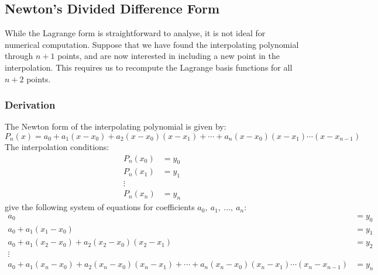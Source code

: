 \documentclass{article}
\begin{document}
\subsection{Newton's Divided Difference Form}
While the Lagrange form is straightforward to analyse,
it is not ideal for numerical computation.
Suppose that we have found the interpolating polynomial through
\(n + 1\) points, and are now interested in including a new point
in the interpolation. This requires us to recompute the Lagrange
basis functions for all \(n + 2\) points.
\subsubsection{Derivation}
The Newton form of the interpolating polynomial is given by:
\begin{equation*}
    P_n\left( x \right) = a_0 + a_1 \left( x - x_0 \right) + a_2 \left( x - x_0 \right) \left( x - x_1 \right) + \cdots + a_n \left( x - x_0 \right) \left( x - x_1 \right) \cdots \left( x - x_{n - 1} \right)
\end{equation*}
The interpolation conditions:
\begin{align*}
    P_n\left( x_0 \right) & = y_0 \\
    P_n\left( x_1 \right) & = y_1 \\
    \vdots                        \\
    P_n\left( x_n \right) & = y_n
\end{align*}
give the following system of equations for coefficients \(a_0,\: a_1,\: \dots,\: a_n\):
\begin{align*}
    a_0                                                                                                                                                                                               & = y_0 \\
    a_0 + a_1 \left( x_1 - x_0 \right)                                                                                                                                                                & = y_1 \\
    a_0 + a_1 \left( x_2 - x_0 \right) + a_2 \left( x_2 - x_0 \right) \left( x_2 - x_1 \right)                                                                                                        & = y_2 \\
    \vdots                                                                                                                                                                                            &       \\
    a_0 + a_1 \left( x_n - x_0 \right) + a_2 \left( x_n - x_0 \right) \left( x_n - x_1 \right) + \cdots + a_n \left( x_n - x_0 \right) \left( x_n - x_1 \right) \cdots \left( x_n - x_{n - 1} \right) & = y_n
\end{align*}
\end{document}
